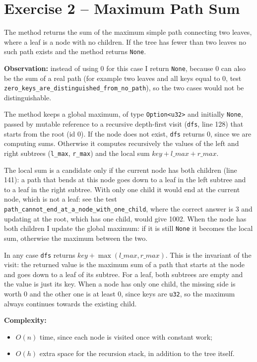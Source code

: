 \documentclass[11pt,a4paper]{article}
\begin{document}
\section*{Exercise 2 -- Maximum Path Sum}

The method returns the sum of the maximum simple path connecting two leaves, where a leaf is a node with
no children. If the tree has fewer than two leaves no such path exists and the method returns
\texttt{None}.

\textbf{Observation:} instead of using 0 for this case I return \texttt{None}, because 0 can also be the sum
of a real path (for example two leaves and all keys equal to 0, test
\texttt{zero\_keys\_are\_distinguished\_from\_no\_path}), so the two cases would not be distinguishable.

The method keeps a global maximum, of type \texttt{Option<u32>} and initially \texttt{None}, passed by
mutable reference to a recursive depth-first visit (\texttt{dfs}, line 128) that starts from the root (id 0).
If the node does not exist, \texttt{dfs} returns 0, since we are computing sums. Otherwise it computes
recursively the values of the left and right subtrees (\texttt{l\_max}, \texttt{r\_max}) and the local sum
$\mathit{key} + \mathit{l\_max} + \mathit{r\_max}$.

The local sum is a candidate only if the current node has both children (line 141): a path that bends at
this node goes down to a leaf in the left subtree and to a leaf in the right subtree. With only one child
it would end at the current node, which is not a leaf: see the test
\texttt{path\_cannot\_end\_at\_a\_node\_with\_one\_child}, where the correct answer is 3 and updating at the
root, which has one child, would give 1002. When the node has both children I update the global maximum:
if it is still \texttt{None} it becomes the local sum, otherwise the maximum between the two.

In any case \texttt{dfs} returns $\mathit{key} + \max(\mathit{l\_max}, \mathit{r\_max})$. This is the
invariant of the visit: the returned value is the maximum sum of a path that starts at the node and goes
down to a leaf of its subtree. For a leaf, both subtrees are empty and the value is just its key. When a
node has only one child, the missing side is worth 0 and the other one is at least 0, since keys are
\texttt{u32}, so the maximum always continues towards the existing child.

\textbf{Complexity:}
\begin{itemize}
\item $O(n)$ time, since each node is visited once with constant work;
\item $O(h)$ extra space for the recursion stack, in addition to the tree itself.
\end{itemize}
\end{document}
